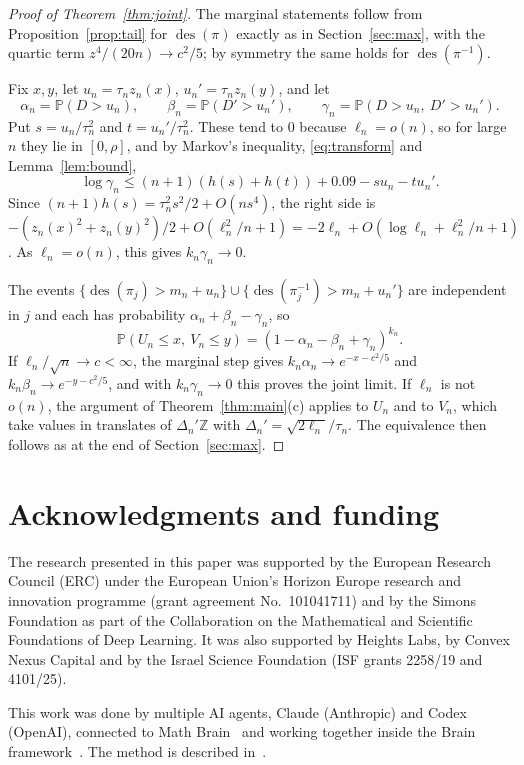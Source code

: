\documentclass[11pt]{amsart}
\theoremstyle{remark}
\newcommand{\des}{\operatorname{des}}
\renewcommand{\P}{\mathbb{P}}
\newcommand{\Z}{\mathbb{Z}}
\begin{document}
\begin{proof}[Proof of Theorem~\ref{thm:joint}]
The marginal statements follow from Proposition~\ref{prop:tail} for $\des(\pi)$ exactly as in Section~\ref{sec:max}, with the quartic term $z^4/(20n)\to c^2/5$; by symmetry the same holds for $\des(\pi^{-1})$.

Fix $x,y$, let $u_n=\tau_nz_n(x)$, $u_n'=\tau_nz_n(y)$, and let
\[
\alpha_n=\P(D>u_n),\qquad \beta_n=\P(D'>u_n'),\qquad \gamma_n=\P(D>u_n,\ D'>u_n').
\]
Put $s=u_n/\tau_n^2$ and $t=u_n'/\tau_n^2$. These tend to $0$ because $\ell_n=o(n)$, so for large $n$ they lie in $[0,\rho]$, and by Markov's inequality, \eqref{eq:transform} and Lemma~\ref{lem:bound},
\[
\log \gamma_n\le(n+1)(h(s)+h(t))+0.09-su_n-tu_n'.
\]
Since $(n+1)h(s)=\tau_n^2s^2/2+O(ns^4)$, the right side is $-(z_n(x)^2+z_n(y)^2)/2+O(\ell_n^2/n+1)=-2\ell_n+O(\log\ell_n+\ell_n^2/n+1)$. As $\ell_n=o(n)$, this gives $k_n\gamma_n\to0$.

The events $\{\des(\pi_j)>m_n+u_n\}\cup\{\des(\pi_j^{-1})>m_n+u_n'\}$ are independent in $j$ and each has probability $\alpha_n+\beta_n-\gamma_n$, so
\[
\P(U_n\le x,\ V_n\le y)=(1-\alpha_n-\beta_n+\gamma_n)^{k_n}.
\]
If $\ell_n/\sqrt n\to c<\infty$, the marginal step gives $k_n\alpha_n\to e^{-x-c^2/5}$ and $k_n\beta_n\to e^{-y-c^2/5}$, and with $k_n\gamma_n\to0$ this proves the joint limit. If $\ell_n$ is not $o(n)$, the argument of Theorem~\ref{thm:main}(c) applies to $U_n$ and to $V_n$, which take values in translates of $\Delta_n'\Z$ with $\Delta_n'=\sqrt{2\ell_n}/\tau_n$. The equivalence then follows as at the end of Section~\ref{sec:max}.
\end{proof}

\section*{Acknowledgments and funding}

The research presented in this paper was supported by the European Research Council (ERC) under the European Union's Horizon Europe research and innovation programme (grant agreement No.~101041711) and by the Simons Foundation as part of the Collaboration on the Mathematical and Scientific Foundations of Deep Learning. It was also supported by Heights Labs, by Convex Nexus Capital and by the Israel Science Foundation (ISF grants 2258/19 and 4101/25).

This work was done by multiple AI agents, Claude (Anthropic) and Codex (OpenAI), connected to Math Brain~\cite{MathBrainRepo} and working together inside the Brain framework~\cite{BrainFramework}. The method is described in~\cite{MathBrainPaper}.
\end{document}
